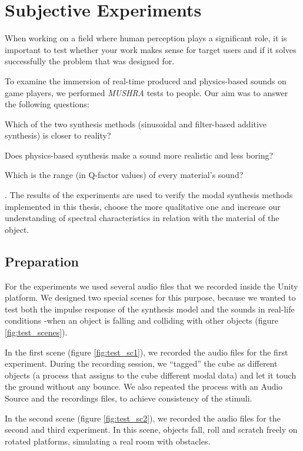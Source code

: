 \chapter{Subjective Experiments}\label{ch:tests}
When working on a field where human perception plays a significant role, it is important to test whether your work makes sense for target users and if it solves successfully the problem that was designed for.

To examine the immersion of real-time produced and physics-based sounds on game players, we performed \textit{MUSHRA}\cite{series2014method} tests to people. Our aim was to answer the following questions: \begin{inparaenum}[1)]
\item Which of the two synthesis methods (sinusoidal and filter-based additive synthesis) is closer to reality? 
\item Does physics-based synthesis make a sound more realistic and less boring?
\item Which is the range (in Q-factor values) of every material's sound?
\end{inparaenum}.
The results of the experiments are used to verify the modal synthesis methods implemented in this thesis, choose the more qualitative one and increase our understanding of spectral characteristics in relation with the material of the object. 

\section{Preparation}
For the experiments we used several audio files that we recorded inside the Unity\textsuperscript{\textregistered} platform. We designed two special scenes for this purpose, because we wanted to test both the impulse response of the synthesis model and the sounds in real-life conditions -when an object is falling and colliding with other objects (figure \ref{fig:test_scenes}). 

In the first scene (figure \ref{fig:test_sc1}), we recorded the audio files for the first experiment. During the recording session, we ``tagged'' the cube as different objects (a process that assigns to the cube different modal data) and let it touch the ground without any bounce. We also repeated the process with an Audio Source and the recordings files, to achieve consistency of the stimuli.

In the second scene (figure \ref{fig:test_sc2}), we recorded the audio files for the second and third experiment. In this scene, objects fall, roll and scratch freely on rotated platforms, simulating a real room with obstacles.

